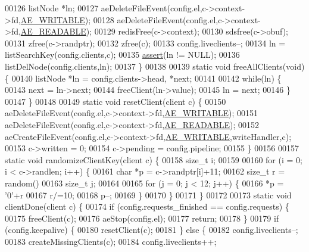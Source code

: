 \begin{DoxyCode}
00126     listNode *ln;
00127     aeDeleteFileEvent(config.el,c->context->fd,\hyperlink{ae_8h_ab6bfb0366ccb6277112d132c2a2bf500}{AE\_WRITABLE});
00128     aeDeleteFileEvent(config.el,c->context->fd,\hyperlink{ae_8h_a7a9a2162d007d09739955b4e55c65bf3}{AE\_READABLE});
00129     redisFree(c->context);
00130     sdsfree(c->obuf);
00131     zfree(c->randptr);
00132     zfree(c);
00133     config.liveclients--;
00134     ln = listSearchKey(config.clients,c);
00135     \hyperlink{redisassert_8h_a993abaa2c168852c1592879472938781}{assert}(ln != NULL);
00136     listDelNode(config.clients,ln);
00137 \}
00138 
00139 \textcolor{keyword}{static} \textcolor{keywordtype}{void} freeAllClients(\textcolor{keywordtype}{void}) \{
00140     listNode *ln = config.clients->head, *next;
00141 
00142     \textcolor{keywordflow}{while}(ln) \{
00143         next = ln->next;
00144         freeClient(ln->value);
00145         ln = next;
00146     \}
00147 \}
00148 
00149 \textcolor{keyword}{static} \textcolor{keywordtype}{void} resetClient(client c) \{
00150     aeDeleteFileEvent(config.el,c->context->fd,\hyperlink{ae_8h_ab6bfb0366ccb6277112d132c2a2bf500}{AE\_WRITABLE});
00151     aeDeleteFileEvent(config.el,c->context->fd,\hyperlink{ae_8h_a7a9a2162d007d09739955b4e55c65bf3}{AE\_READABLE});
00152     aeCreateFileEvent(config.el,c->context->fd,\hyperlink{ae_8h_ab6bfb0366ccb6277112d132c2a2bf500}{AE\_WRITABLE},writeHandler,c);
00153     c->written = 0;
00154     c->pending = config.pipeline;
00155 \}
00156 
00157 \textcolor{keyword}{static} \textcolor{keywordtype}{void} randomizeClientKey(client c) \{
00158     size\_t i;
00159 
00160     \textcolor{keywordflow}{for} (i = 0; i < c->randlen; i++) \{
00161         \textcolor{keywordtype}{char} *p = c->randptr[i]+11;
00162         size\_t r = random() %
00163         size\_t j;
00164 
00165         \textcolor{keywordflow}{for} (j = 0; j < 12; j++) \{
00166             *p = \textcolor{stringliteral}{'0'}+r%
00167             r/=10;
00168             p--;
00169         \}
00170     \}
00171 \}
00172 
00173 \textcolor{keyword}{static} \textcolor{keywordtype}{void} clientDone(client c) \{
00174     \textcolor{keywordflow}{if} (config.requests\_finished == config.requests) \{
00175         freeClient(c);
00176         aeStop(config.el);
00177         \textcolor{keywordflow}{return};
00178     \}
00179     \textcolor{keywordflow}{if} (config.keepalive) \{
00180         resetClient(c);
00181     \} \textcolor{keywordflow}{else} \{
00182         config.liveclients--;
00183         createMissingClients(c);
00184         config.liveclients++;

\end{DoxyCode}
